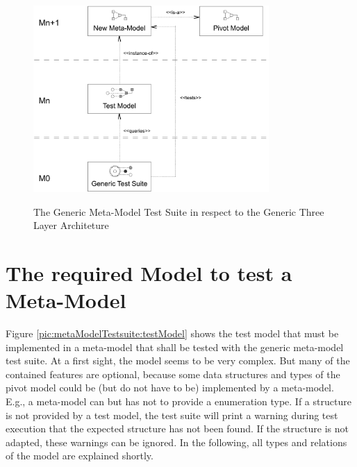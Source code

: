 \begin{figure}[!t]
	\centering
		\includegraphics[width=0.80\textwidth]{figures/metamodeltestsuite/genericTestSuite.pdf}
	\label{pic:metaModelTestsuite:genericTestSuite}
	\caption{The Generic Meta-Model Test Suite in respect to the Generic Three Layer Architeture}
\end{figure}




\section{The required Model to test a Meta-Model}

Figure \ref{pic:metaModelTestsuite:testModel} shows the test model that must be implemented in a meta-model that shall be tested with the generic meta-model test suite. At a first sight, the model seems to be very complex. But many of the contained features are optional, because some data structures and types of the pivot model could be (but do not have to be) implemented by a meta-model. E.g., a meta-model can but has not to provide a enumeration type. If a structure is not provided by a test model, the test suite will print a warning during test execution that the expected structure has not been found. If the structure is not adapted, these warnings can be ignored. In the following, all types and relations of the model are explained shortly.


